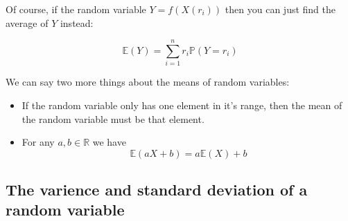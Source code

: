 Of course, if the random variable $Y = f(X(r_i))$ then you can just find
the average of $Y$ instead:

\begin{dmath}
	\mathbb{E}(Y) = {\sum\limits_{i=1}^{n} r_i \mathbb{P}(Y = r_i)}
\end{dmath}

We can say two more things about the means of random variables:

\begin{itemize}
	\item If the random variable only has one element in it's range, then the mean of the random variable must be that element.
	\item For any $a, b \in \mathbb{R}$ we have
	\begin{dmath}
		\mathbb{E}(aX + b) = a\mathbb{E}(X) + b
	\end{dmath}
\end{itemize}

\subsection{The varience and standard deviation of a random variable}

